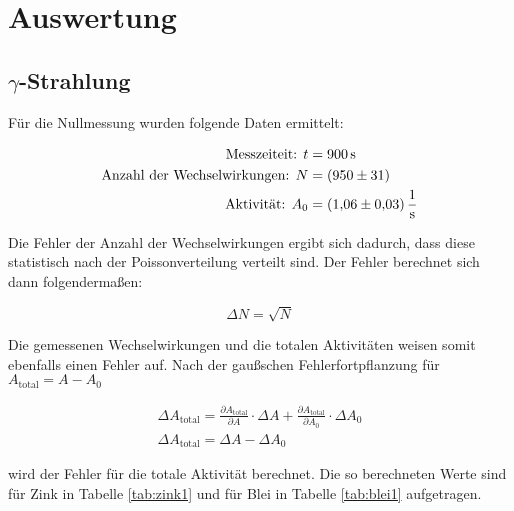 \section{Auswertung}
\label{sec:Auswertung}

\subsection{\texorpdfstring{$\gamma$}{Gamma}-Strahlung}

Für die Nullmessung wurden folgende Daten ermittelt:

\begin{align*}
  \text{Messzeiteit: } t &= \SI{900}{\second} \\
  \text{Anzahl der Wechselwirkungen: } N &= (950 \pm 31) \\
  \text{Aktivität: } A_0 &= \SI{1.06 \pm 0.03}{\per\second}
\end{align*}

Die Fehler der Anzahl der Wechselwirkungen ergibt sich dadurch, dass diese statistisch nach der Poissonverteilung verteilt sind.
Der Fehler berechnet sich dann folgendermaßen:

\begin{equation}
  \Delta N = \sqrt{N}
\end{equation}

Die gemessenen Wechselwirkungen und die totalen Aktivitäten weisen somit ebenfalls einen Fehler auf.
Nach der gaußschen Fehlerfortpflanzung für $A_\text{total} = A - A_0$

\begin{gather}
    \Delta A_\text{total} = \frac{\partial A_\text{total}}{\partial A} \cdot \Delta A + \frac{\partial A_\text{total}}{\partial A_0} \cdot \Delta A_0 \\
    \Delta A_\text{total} = \Delta A - \Delta A_0
\end{gather}

wird der Fehler für die totale Aktivität berechnet.
Die so berechneten Werte sind für Zink in Tabelle \ref{tab:zink1} und für Blei in Tabelle \ref{tab:blei1} aufgetragen.

